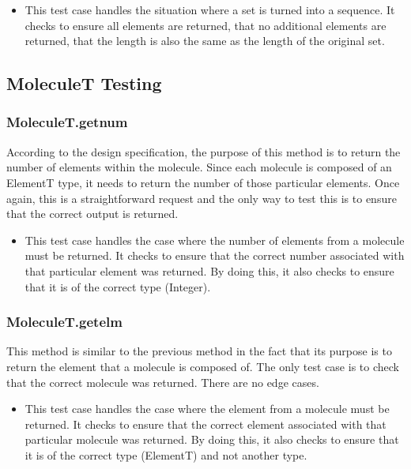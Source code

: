 \documentclass[12pt]{article}
\begin{document}
\begin{itemize}
  \item This test case handles the situation where a set is turned into a sequence. It checks to ensure all elements are returned, that no additional elements are returned, that the length is also the same as the length of the original set.
\end{itemize}



\subsection{MoleculeT Testing}

\subsubsection{MoleculeT.get\textunderscore num}
According to the design specification, the purpose of this method is to return the number of elements within the molecule. Since each molecule
is composed of an ElementT type, it needs to return the number of those particular elements. Once again, this is a straightforward request
and the only way to test this is to ensure that the correct output is returned.

\begin{itemize}
  \item This test case handles the case where the number of elements from a molecule must be returned. It checks to ensure that the correct number
  associated with that particular element was returned. By doing this, it also checks to ensure that it is of the correct type (Integer).
\end{itemize}

\subsubsection{MoleculeT.get\textunderscore elm}
This method is similar to the previous method in the fact that its purpose is to return the element that a molecule is composed of. The only test
case is to check that the correct molecule was returned. There are no edge cases.

\begin{itemize}
  \item This test case handles the case where the element from a molecule must be returned. It checks to ensure that the correct element
  associated with that particular molecule was returned. By doing this, it also checks to ensure that it is of the correct type (ElementT)
  and not another type.
\end{itemize}
\end{document}
